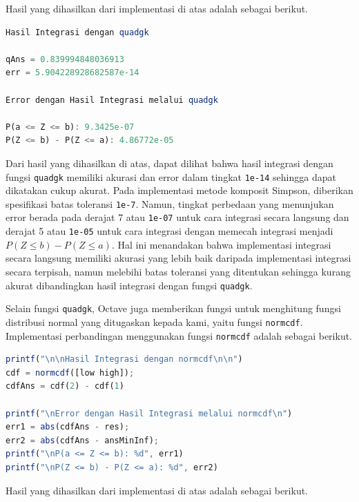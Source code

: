 \documentclass[journal,12pt,onecolumn,a4paper]{IEEEtran}
\begin{document}
Hasil yang dihasilkan dari implementasi di atas adalah sebagai berikut.

\begin{center}
	\begin{lstlisting}[language=Octave]
Hasil Integrasi dengan quadgk

qAns = 0.839994848036913
err = 5.904228928682587e-14
		
Error dengan Hasil Integrasi melalui quadgk

P(a <= Z <= b): 9.3425e-07
P(Z <= b) - P(Z <= a): 4.86772e-05
	\end{lstlisting}
\end{center}

Dari hasil yang dihasilkan di atas, dapat dilihat bahwa hasil integrasi dengan fungsi \lstinline{quadgk} memiliki akurasi dan error dalam tingkat \lstinline{1e-14} sehingga dapat dikatakan cukup akurat. Pada implementasi metode komposit Simpson, diberikan spesifikasi batas toleransi \lstinline{1e-7}. Namun, tingkat perbedaan yang menunjukan error berada pada derajat 7 atau \lstinline{1e-07} untuk cara integrasi secara langsung dan derajat 5 atau \lstinline{1e-05} untuk cara integrasi dengan memecah integrasi menjadi \(P(Z \le b ) - P(Z \le a )\). Hal ini menandakan bahwa implementasi integrasi secara langsung memiliki akurasi yang lebih baik daripada implementasi integrasi secara terpisah, namun melebihi batas toleransi yang ditentukan sehingga kurang akurat dibandingkan hasil integrasi dengan fungsi \lstinline{quadgk}.

Selain fungsi \lstinline{quadgk}, Octave juga memberikan fungsi untuk menghitung fungsi distribusi normal yang ditugaskan kepada kami, yaitu fungsi \lstinline{normcdf}. Implementasi perbandingan menggunakan fungsi \lstinline{normcdf} adalah sebagai berikut.

\begin{center}
	\begin{lstlisting}[language=Octave]
printf("\n\nHasil Integrasi dengan normcdf\n\n")
cdf = normcdf([low high]);
cdfAns = cdf(2) - cdf(1)
		
printf("\nError dengan Hasil Integrasi melalui normcdf\n")
err1 = abs(cdfAns - res);
err2 = abs(cdfAns - ansMinInf);
printf("\nP(a <= Z <= b): %d", err1)
printf("\nP(Z <= b) - P(Z <= a): %d", err2)
	\end{lstlisting}
\end{center}

Hasil yang dihasilkan dari implementasi di atas adalah sebagai berikut.
\end{document}
